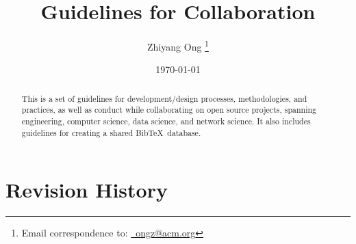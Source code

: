 \documentclass[letter,12pt]{article}
\begin{document}
\title{Guidelines for Collaboration}
\date{\today}
\author{Zhiyang Ong \thanks{Email correspondence to: \href{mailto:ongz@acm.org}{\Email\ ongz@acm.org}}}
\maketitle


\begin{abstract} 
This is a set of guidelines for development/design processes, methodologies, and practices, as well as conduct while collaborating on open source projects, spanning engineering, computer science, data science, and network science. It also includes guidelines for creating a shared {\sc Bib}\TeX\ database.
\end{abstract}


\tableofcontents
\setcounter{secnumdepth}{4}



\section*{Revision History}
\label{sec:RevisionHistory}
\end{document}
